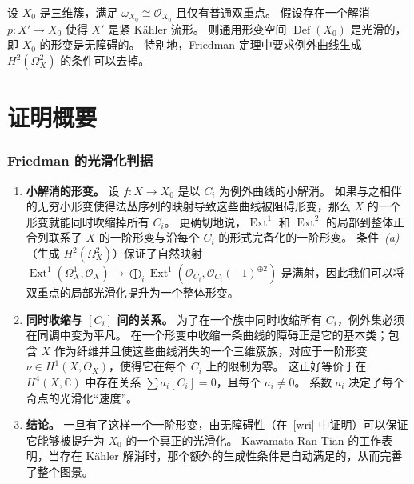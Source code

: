 \begin{theorem}
设 \(X_0\) 是三维簇，满足 \(\omega_{X_0}\cong\mathcal{O}_{X_0}\) 且仅有普通双重点。
假设存在一个解消 \(p\colon X'\to X_0\) 使得 \(X'\) 是紧 Kähler 流形。
则通用形变空间 \(\operatorname{Def}(X_0)\) 是光滑的，即 \(X_0\) 的形变是无障碍的。
特别地，Friedman 定理中要求例外曲线生成 \(H^2(\Omega_X^2)\) 的条件可以去掉。
\end{theorem}

\section{证明概要}

\subsubsection{Friedman 的光滑化判据}

\begin{enumerate}
    \item \textbf{小解消的形变。}
    设 \(f\colon X\to X_0\) 是以 \(C_i\) 为例外曲线的小解消。
    如果与之相伴的无穷小形变使得法丛序列的映射导致这些曲线被阻碍形变，那么 \(X\) 的一个形变就能同时吹缩掉所有 \(C_i\)。
    更确切地说，\(\operatorname{Ext}^1\) 和 \(\operatorname{Ext}^2\) 的局部到整体正合列联系了 \(X\) 的一阶形变与沿每个 \(C_i\) 的形式完备化的一阶形变。
    条件~\emph{(a)}（生成 \(H^2(\Omega_X^2)\)）保证了自然映射 \(\operatorname{Ext}^1(\Omega_X^1,\mathcal{O}_X)\to \bigoplus_i \operatorname{Ext}^1(\mathcal{O}_{C_i},\mathcal{O}_{C_i}(-1)^{\oplus 2})\) 是满射，因此我们可以将双重点的局部光滑化提升为一个整体形变。
    
    \item \textbf{同时收缩与 \([C_i]\) 间的关系。}
    为了在一个族中同时收缩所有 \(C_i\)，例外集必须在同调中变为平凡。
    在一个形变中收缩一条曲线的障碍正是它的基本类；包含 \(X\) 作为纤维并且使这些曲线消失的一个三维簇族，对应于一阶形变 \(\nu\in H^1(X,\Theta_X)\)，使得它在每个 \(C_i\) 上的限制为零。
    这正好等价于在 \(H^4(X,\mathbb{C})\) 中存在关系 \(\sum a_i[C_i]=0\)，且每个 \(a_i\neq 0\)。
    系数 \(a_i\) 决定了每个奇点的光滑化“速度”。
    
    \item \textbf{结论。}
    一旦有了这样一个一阶形变，由无障碍性（在~\ref{wri} 中证明）可以保证它能够被提升为 \(X_0\) 的一个真正的光滑化。
    Kawamata-Ran-Tian 的工作表明，当存在 Kähler 解消时，那个额外的生成性条件是自动满足的，从而完善了整个图景。
\end{enumerate}

